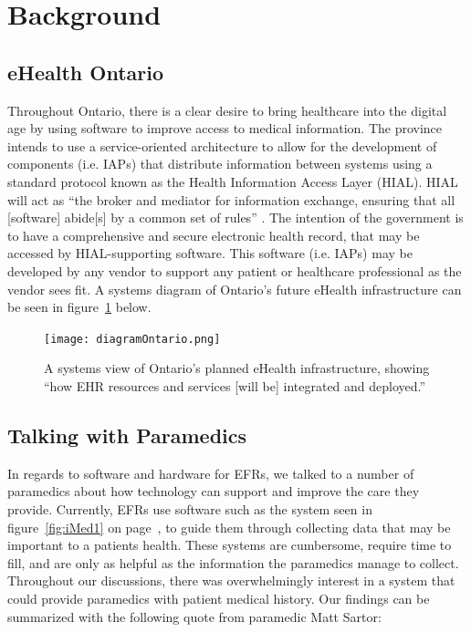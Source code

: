 
\section{Background}

\subsection{eHealth Ontario}

Throughout Ontario, there is a clear desire to bring healthcare into the digital age by using software to improve access to medical information. The province intends to use a service-oriented architecture to allow for the development of components (i.e. IAPs) that distribute information between systems using a standard protocol known as the Health Information Access Layer (HIAL). HIAL will act as ``the broker and mediator for information exchange, ensuring that all [software] abide[s] by a common set of rules'' \cite{b1}. The intention of the government is to have a comprehensive and secure electronic health record, that may be accessed by HIAL-supporting software. This software (i.e. IAPs) may be developed by any vendor to support any patient or healthcare professional as the vendor sees fit. A systems diagram of Ontario's future eHealth infrastructure can be seen in figure~\ref{fig:eHealth1} below.

\begin{figure}[h]
  \centering
  \texttt{[image: diagramOntario.png]}
  \captionsetup{format=hang}
  \caption[Ontario eHealth Systems View]{A systems view of Ontario's planned eHealth infrastructure, showing ``how EHR resources and services [will be] integrated and deployed.'' \cite{b1}}
  \label{fig:eHealth1}
\end{figure}

\subsection{Talking with Paramedics}

In regards to software and hardware for EFRs, we talked to a number of paramedics about how technology can support and improve the care they provide. Currently, EFRs use software such as the system seen in figure~\ref{fig:iMed1} on page~\pageref{fig:iMed1}, to guide them through collecting data that may be important to a patients health. These systems are cumbersome, require time to fill, and are only as helpful as the information the paramedics manage to collect. Throughout our discussions, there was overwhelmingly interest in a system that could provide paramedics with patient medical history. Our findings can be summarized with the following quote from paramedic Matt Sartor:

